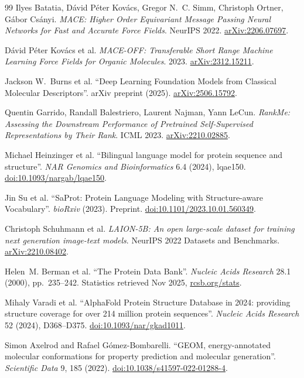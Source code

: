 \documentclass[12pt,a4paper,twoside]{report}
\begin{document}
\begin{thebibliography}{99}
Ilyes Batatia, D\'avid P\'eter Kov\'acs, Gregor N.~C. Simm, Christoph Ortner, G\'abor Cs\'anyi.
\textit{MACE: Higher Order Equivariant Message Passing Neural Networks for Fast and Accurate Force Fields}. NeurIPS 2022.
\href{https://arxiv.org/abs/2206.07697}{arXiv:2206.07697}.

D\'avid P\'eter Kov\'acs et al.
\textit{MACE-OFF: Transferable Short Range Machine Learning Force Fields for Organic Molecules}. 2023.
\href{https://arxiv.org/abs/2312.15211}{arXiv:2312.15211}.

Jackson W.~Burns et al.
``Deep Learning Foundation Models from Classical Molecular Descriptors''.
arXiv preprint (2025).
\href{https://arxiv.org/abs/2506.15792}{arXiv:2506.15792}.

Quentin Garrido, Randall Balestriero, Laurent Najman, Yann LeCun.
\textit{RankMe: Assessing the Downstream Performance of Pretrained Self-Supervised Representations by Their Rank}. ICML 2023.
\href{https://arxiv.org/abs/2210.02885}{arXiv:2210.02885}.

Michael Heinzinger et al.
``Bilingual language model for protein sequence and structure''.
\textit{NAR Genomics and Bioinformatics} 6.4 (2024), lqae150.
\href{https://doi.org/10.1093/nargab/lqae150}{doi:10.1093/nargab/lqae150}.

Jin Su et al.
``SaProt: Protein Language Modeling with Structure-aware Vocabulary''.
\textit{bioRxiv} (2023). Preprint.
\href{https://doi.org/10.1101/2023.10.01.560349}{doi:10.1101/2023.10.01.560349}.


Christoph Schuhmann et al.
\textit{LAION-5B: An open large-scale dataset for training next generation image-text models}. NeurIPS 2022 Datasets and Benchmarks.
\href{https://arxiv.org/abs/2210.08402}{arXiv:2210.08402}.

Helen~M. Berman et al.
``The Protein Data Bank''.
\textit{Nucleic Acids Research} 28.1 (2000), pp.~235--242. Statistics retrieved Nov 2025, \href{https://www.rcsb.org/stats}{rcsb.org/stats}.

Mihaly Varadi et al.
``AlphaFold Protein Structure Database in 2024: providing structure coverage for over 214 million protein sequences''.
\textit{Nucleic Acids Research} 52 (2024), D368--D375.
\href{https://doi.org/10.1093/nar/gkad1011}{doi:10.1093/nar/gkad1011}.

Simon Axelrod and Rafael G\'omez-Bombarelli.
``GEOM, energy-annotated molecular conformations for property prediction and molecular generation''.
\textit{Scientific Data} 9, 185 (2022).
\href{https://doi.org/10.1038/s41597-022-01288-4}{doi:10.1038/s41597-022-01288-4}.


\end{thebibliography}
\end{document}

